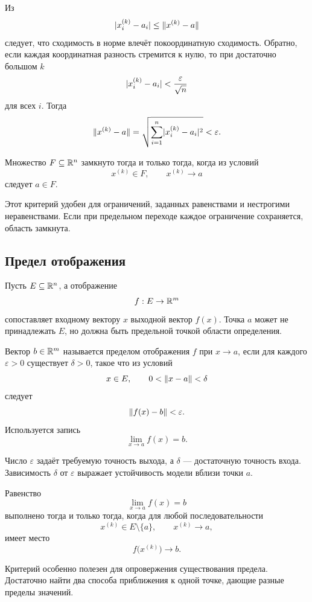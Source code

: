 \begin{proofidea}
Из
\[
\lvert x_i^{(k)}-a_i\rvert
\leq
\lVert x^{(k)}-a\rVert
\]
следует, что сходимость в норме влечёт покоординатную сходимость. Обратно, если каждая координатная разность стремится к нулю, то при достаточно большом \(k\)
\[
\lvert x_i^{(k)}-a_i\rvert<\frac{\varepsilon}{\sqrt n}
\]
для всех \(i\). Тогда
\[
\lVert x^{(k)}-a\rVert
=
\sqrt{\sum_{i=1}^n\lvert x_i^{(k)}-a_i\rvert^2}
<\varepsilon.
\]
\end{proofidea}

\begin{criterion}
Множество \(F\subseteq\mathbb{R}^n\) замкнуто тогда и только тогда, когда из условий
\[
x^{(k)}\in F,
\qquad
x^{(k)}\to a
\]
следует \(a\in F\).
\end{criterion}

Этот критерий удобен для ограничений, заданных равенствами и нестрогими неравенствами. Если при предельном переходе каждое ограничение сохраняется, область замкнута.

\subsection{Предел отображения}

Пусть \(E\subseteq\mathbb{R}^n\), а отображение
\[
f:E\to\mathbb{R}^m
\]
сопоставляет входному вектору \(x\) выходной вектор \(f(x)\). Точка \(a\) может не принадлежать \(E\), но должна быть предельной точкой области определения.

\begin{definition}
Вектор \(b\in\mathbb{R}^m\) называется пределом отображения \(f\) при \(x\to a\), если для каждого \(\varepsilon>0\) существует \(\delta>0\), такое что из условий
\[
x\in E,
\qquad
0<\lVert x-a\rVert<\delta
\]
следует
\[
\lVert f(x)-b\rVert<\varepsilon.
\]
Используется запись
\[
\lim_{x\to a}f(x)=b.
\]
\end{definition}

Число \(\varepsilon\) задаёт требуемую точность выхода, а \(\delta\) --- достаточную точность входа. Зависимость \(\delta\) от \(\varepsilon\) выражает устойчивость модели вблизи точки \(a\).

\begin{theorem}
Равенство
\[
\lim_{x\to a}f(x)=b
\]
выполнено тогда и только тогда, когда для любой последовательности
\[
x^{(k)}\in E\setminus\{a\},
\qquad
x^{(k)}\to a,
\]
имеет место
\[
f\bigl(x^{(k)}\bigr)\to b.
\]
\end{theorem}

Критерий особенно полезен для опровержения существования предела. Достаточно найти два способа приближения к одной точке, дающие разные пределы значений.

